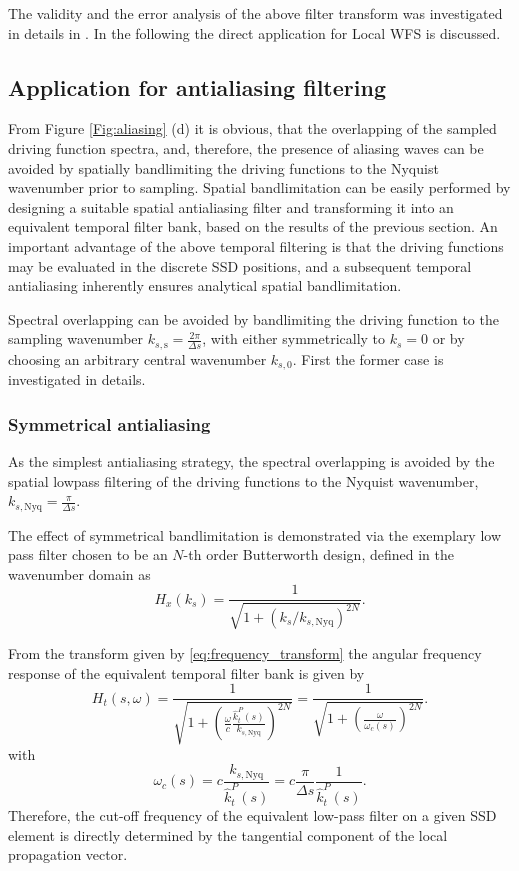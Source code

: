 \documentclass[conference]{IEEEtran}
\begin{document}
The validity and the error analysis of the above filter transform was investigated in details in \cite{Firtha DAGA2023}.
In the following the direct application for Local WFS is discussed.

\subsection{Application for antialiasing filtering}

From Figure \ref{Fig:aliasing} (d) it is obvious, that the overlapping of the sampled driving function spectra, and, therefore, the presence of aliasing waves can be avoided by spatially bandlimiting the driving functions to the Nyquist wavenumber prior to sampling.
Spatial bandlimitation can be easily performed by designing a suitable spatial antialiasing filter and transforming it into an equivalent temporal filter bank, based on the results of the previous section.
An important advantage of the above temporal filtering is that the driving functions may be evaluated in the discrete SSD positions, and a subsequent temporal antialiasing inherently ensures analytical spatial bandlimitation.

Spectral overlapping can be avoided by bandlimiting the driving function to the sampling wavenumber $k_{s,\mathrm{s}} = \frac{2\pi}{\Delta s}$, with either symmetrically to $k_s = 0$ or by choosing an arbitrary central wavenumber $k_{s,0}$.
First the former case is investigated in details.

\subsubsection{Symmetrical antialiasing}
As the simplest antialiasing strategy, the spectral overlapping is avoided by the spatial lowpass filtering of the driving functions to the Nyquist wavenumber, $k_{s,\mathrm{Nyq}} = \frac{\pi}{\Delta s}$.

The effect of symmetrical bandlimitation is demonstrated via the exemplary low pass filter chosen to be an $N$-th order Butterworth design, defined in the wavenumber domain as
\begin{equation}
    H_x(k_s) = \frac{ 1 }{ \sqrt{ 1 + \left( k_s / k_{s,\mathrm{Nyq}} \right)^{2N} } }.
\end{equation}

From the transform given by \eqref{eq:frequency_transform} the angular frequency response of the equivalent temporal filter bank is given by
\begin{equation}
    H_t(s,\omega) = \frac{ 1 }{ \sqrt{ 1 + \left( \frac{\omega}{c}\frac{\hat{k}_t^P(s)}{k_{s,\mathrm{Nyq}}}  \right)^{2N} } } =  \frac{ 1 }{ \sqrt{ 1 + \left( \frac{\omega}{\omega_c(s)}  \right)^{2N} } } .
\end{equation}
with
\begin{equation}
    \omega_c(s) = c \frac{k_{s,\mathrm{Nyq}}}{\hat{k}_t^P(s)} = c\frac{ \pi}{\Delta s} \frac{1}{\hat{k}_t^P(s)}.
    \label{eq:cutoff_fr}
\end{equation}
Therefore, the cut-off frequency of the equivalent low-pass filter on a given SSD element is directly determined by the tangential component of the local propagation vector.
\end{document}
